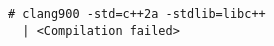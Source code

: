 \begin{lstlisting}[language={},numbers=none,title=\href{https://godbolt.org/z/3CIQW_}{\texttt{godbolt.org/z/3CIQW\_}}]
# clang900 -std=c++2a -stdlib=libc++
  | <Compilation failed>
\end{lstlisting}
